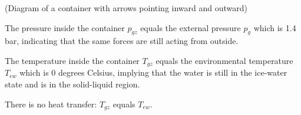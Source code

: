 (Diagram of a container with arrows pointing inward and outward)

The pressure inside the container \( p_{gz} \) equals the external pressure \( p_g \) which is 1.4 bar, indicating that the same forces are still acting from outside.

The temperature inside the container \( T_{gz} \) equals the environmental temperature \( T_{ew} \) which is 0 degrees Celsius, implying that the water is still in the ice-water state and is in the solid-liquid region.

There is no heat transfer: \( T_{gz} \) equals \( T_{ew} \).
